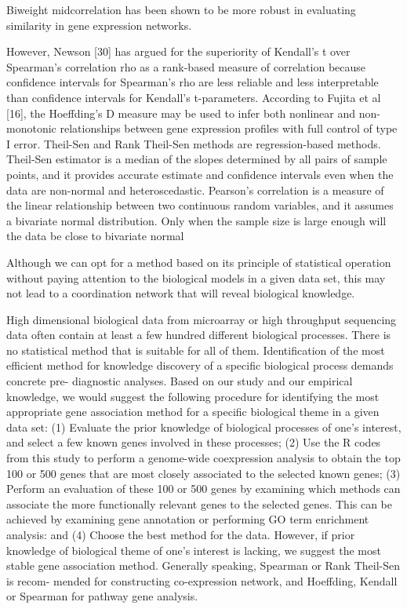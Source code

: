 Biweight midcorrelation has been shown to be more robust in evaluating similarity in gene expression networks.


However, Newson [30] has argued for the superiority of Kendall’s t over Spearman’s correlation rho as a rank-based measure of correlation because confidence intervals for Spearman’s rho are less reliable and less interpretable than confidence intervals for Kendall’s t-parameters. According to Fujita et al [16], the Hoeffding’s D measure may be used to infer both nonlinear and non-monotonic relationships between gene expression profiles with full control of type I error. Theil-Sen and Rank Theil-Sen methods are regression-based methods. Theil-Sen estimator is a median of the slopes determined by all pairs of sample points, and it provides accurate estimate and confidence intervals even when the data are non-normal and heteroscedastic. Pearson’s correlation is a measure of the linear relationship between two continuous random variables, and it assumes a bivariate normal distribution. Only when the sample size is large enough will the data be close to bivariate normal

Although we can opt for a method based on its principle of statistical operation without paying attention to the biological models in a given data set, this may not lead to a coordination network that will reveal biological knowledge. 

High dimensional biological data from microarray or high throughput sequencing data often contain at least a few hundred different biological processes. There is no statistical method that is suitable for all of them. Identification of the most efficient method for knowledge discovery of a specific biological process demands concrete pre- diagnostic analyses. Based on our study and our empirical knowledge, we would suggest the following procedure for identifying the most appropriate gene association method for a specific biological theme in a given data set: (1) Evaluate the prior knowledge of biological processes of one’s interest, and select a few known genes involved in these processes; (2) Use the R codes from this study to perform a genome-wide coexpression analysis to obtain the top 100 or 500 genes that are most closely associated to the selected known genes; (3) Perform an evaluation of these 100 or 500 genes by examining which methods can associate the more functionally relevant genes to the selected genes. This can be achieved by examining gene annotation or performing GO term enrichment analysis: and (4) Choose the best method for the data. However, if prior knowledge of biological theme of one’s interest is lacking, we suggest the most stable gene association method. Generally speaking, Spearman or Rank Theil-Sen is recom- mended for constructing co-expression network, and Hoeffding, Kendall or Spearman for pathway gene analysis.


